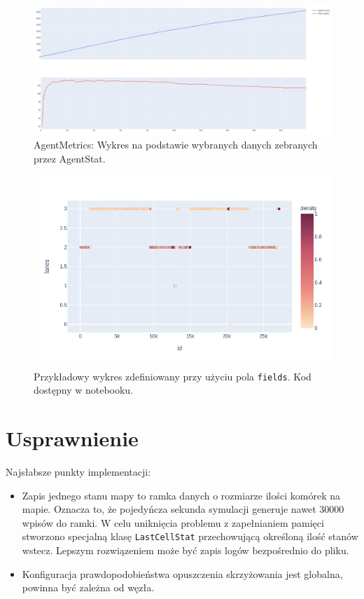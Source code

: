 \documentclass[a4paper,12pt]{article}
\begin{document}
    \begin{figure}[h]
    	\centering
    	\includegraphics[width=\textwidth]{img/sim-agents.jpg}
    	\caption{AgentMetrics: Wykres na podstawie wybranych danych zebranych przez AgentStat.}
    \end{figure}
    
    \begin{figure}[h]
    	\centering
    	\includegraphics[width=\textwidth]{img/note-custom.png}
    	\caption{Przykładowy wykres zdefiniowany przy użyciu pola \texttt{fields}. Kod dostępny w notebooku.}
    \end{figure}

    \section{Usprawnienie}
    Najsłabsze punkty implementacji:
    
    \begin{itemize}
    	\item Zapis jednego stanu mapy to ramka danych o rozmiarze ilości komórek na mapie. Oznacza to, że pojedyńcza sekunda symulacji generuje nawet 30000 wpisów do ramki. W celu uniknięcia problemu z zapełnianiem pamięci stworzono specjalną klasę \texttt{LastCellStat} przechowującą określoną ilość stanów wstecz.
    	Lepszym rozwiązeniem może być zapis logów bezpośrednio do pliku.
    	
    	\item Konfiguracja prawdopodobieństwa opuszczenia skrzyżowania jest globalna, powinna być zależna od węzła.
    \end{itemize}
\end{document}
